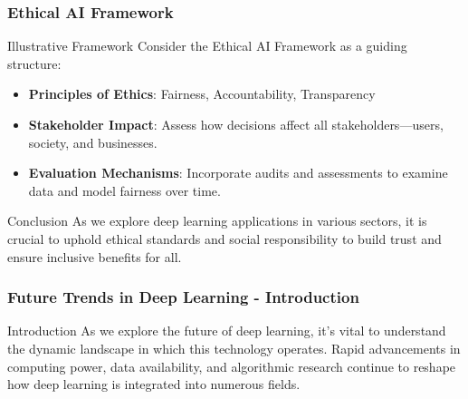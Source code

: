 \documentclass[aspectratio=169]{beamer}
\begin{document}
\begin{frame}[fragile]
    \frametitle{Ethical AI Framework}
    \begin{block}{Illustrative Framework}
        Consider the Ethical AI Framework as a guiding structure:
        \begin{itemize}
            \item \textbf{Principles of Ethics}: Fairness, Accountability, Transparency
            \item \textbf{Stakeholder Impact}: Assess how decisions affect all stakeholders—users, society, and businesses.
            \item \textbf{Evaluation Mechanisms}: Incorporate audits and assessments to examine data and model fairness over time.
        \end{itemize}
    \end{block}

    \begin{block}{Conclusion}
        As we explore deep learning applications in various sectors, it is crucial to uphold ethical standards and social responsibility to build trust and ensure inclusive benefits for all.
    \end{block}
\end{frame}

\begin{frame}[fragile]
    \frametitle{Future Trends in Deep Learning - Introduction}
    \begin{block}{Introduction}
        As we explore the future of deep learning, it's vital to understand the dynamic landscape in which this technology operates. Rapid advancements in computing power, data availability, and algorithmic research continue to reshape how deep learning is integrated into numerous fields.
    \end{block}
\end{frame}
\end{document}
